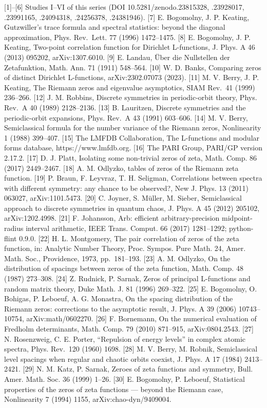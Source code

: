 \documentclass[
  10pt,
]{article}
\begin{document}
{[}1{]}--{[}6{]} Studies I--VI of this series (DOI
10.5281/zenodo.23815328, .23928017, .23991165, .24094318, .24256378,
.24381946). {[}7{]} E. Bogomolny, J. P. Keating, Gutzwiller's trace
formula and spectral statistics: beyond the diagonal approximation,
Phys. Rev.~Lett. 77 (1996) 1472--1475. {[}8{]} E. Bogomolny, J. P.
Keating, Two-point correlation function for Dirichlet L-functions, J.
Phys. A 46 (2013) 095202, arXiv:1307.6010. {[}9{]} E. Landau, Über die
Nullstellen der Zetafunktion, Math. Ann. 71 (1911) 548--564. {[}10{]} W.
D. Banks, Comparing zeros of distinct Dirichlet L-functions,
arXiv:2302.07073 (2023). {[}11{]} M. V. Berry, J. P. Keating, The
Riemann zeros and eigenvalue asymptotics, SIAM Rev.~41 (1999) 236--266.
{[}12{]} J. M. Robbins, Discrete symmetries in periodic-orbit theory,
Phys. Rev.~A 40 (1989) 2128--2136. {[}13{]} B. Lauritzen, Discrete
symmetries and the periodic-orbit expansions, Phys. Rev.~A 43 (1991)
603--606. {[}14{]} M. V. Berry, Semiclassical formula for the number
variance of the Riemann zeros, Nonlinearity 1 (1988) 399--407. {[}15{]}
The LMFDB Collaboration, The L-functions and modular forms database,
https://www.lmfdb.org. {[}16{]} The PARI Group, PARI/GP version 2.17.2.
{[}17{]} D. J. Platt, Isolating some non-trivial zeros of zeta, Math.
Comp. 86 (2017) 2449--2467. {[}18{]} A. M. Odlyzko, tables of zeros of
the Riemann zeta function. {[}19{]} P. Braun, F. Leyvraz, T. H.
Seligman, Correlations between spectra with different symmetry: any
chance to be observed?, New J. Phys. 13 (2011) 063027, arXiv:1101.5473.
{[}20{]} C. Joyner, S. Müller, M. Sieber, Semiclassical approach to
discrete symmetries in quantum chaos, J. Phys. A 45 (2012) 205102,
arXiv:1202.4998. {[}21{]} F. Johansson, Arb: efficient
arbitrary-precision midpoint-radius interval arithmetic, IEEE Trans.
Comput. 66 (2017) 1281--1292; python-flint 0.9.0. {[}22{]} H. L.
Montgomery, The pair correlation of zeros of the zeta function, in:
Analytic Number Theory, Proc. Sympos. Pure Math. 24, Amer. Math. Soc.,
Providence, 1973, pp.~181--193. {[}23{]} A. M. Odlyzko, On the
distribution of spacings between zeros of the zeta function, Math. Comp.
48 (1987) 273--308. {[}24{]} Z. Rudnick, P. Sarnak, Zeros of principal
L-functions and random matrix theory, Duke Math. J. 81 (1996) 269--322.
{[}25{]} E. Bogomolny, O. Bohigas, P. Leboeuf, A. G. Monastra, On the
spacing distribution of the Riemann zeros: corrections to the asymptotic
result, J. Phys. A 39 (2006) 10743--10754, arXiv:math/0602270. {[}26{]}
F. Bornemann, On the numerical evaluation of Fredholm determinants,
Math. Comp. 79 (2010) 871--915, arXiv:0804.2543. {[}27{]} N. Rosenzweig,
C. E. Porter, ``Repulsion of energy levels'' in complex atomic spectra,
Phys. Rev.~120 (1960) 1698. {[}28{]} M. V. Berry, M. Robnik,
Semiclassical level spacings when regular and chaotic orbits coexist, J.
Phys. A 17 (1984) 2413--2421. {[}29{]} N. M. Katz, P. Sarnak, Zeroes of
zeta functions and symmetry, Bull. Amer. Math. Soc. 36 (1999) 1--26.
{[}30{]} E. Bogomolny, P. Leboeuf, Statistical properties of the zeros
of zeta functions --- beyond the Riemann case, Nonlinearity 7 (1994)
1155, arXiv:chao-dyn/9409004.
\end{document}

